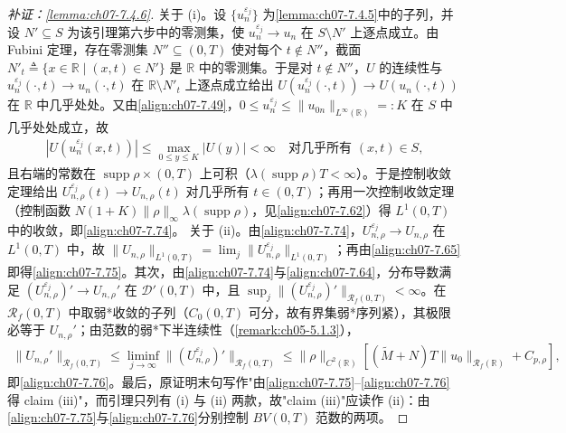 ﻿\documentclass[../../main.tex]{subfiles}%
\begin{document}
\begin{proof}[补证：\cref{lemma:ch07-7.4.6}]
关于 (i)。设 $\{u_n^{\varepsilon_j}\}$ 为\cref{lemma:ch07-7.4.5}中的子列，并设 $N'\subseteq S$ 为该引理第六步中的零测集，使 $u_n^{\varepsilon_j}\to u_n$ 在 $S\setminus N'$ 上逐点成立。由 Fubini 定理，存在零测集 $N''\subseteq(0,T)$ 使对每个 $t\notin N''$，截面 $N'_t\triangleq\{x\in\mathbb{R}\mid(x,t)\in N'\}$ 是 $\mathbb{R}$ 中的零测集。于是对 $t\notin N''$，$U$ 的连续性与 $u_n^{\varepsilon_j}(\cdot,t)\to u_n(\cdot,t)$ 在 $\mathbb{R}\setminus N'_t$ 上逐点成立给出 $U(u_n^{\varepsilon_j}(\cdot,t))\to U(u_n(\cdot,t))$ 在 $\mathbb{R}$ 中几乎处处。又由\eqref{align:ch07-7.49}，$0\leqslant u_n^{\varepsilon_j}\leqslant\|u_{0n}\|_{L^\infty(\mathbb{R})}=:K$ 在 $S$ 中几乎处处成立，故
\begin{align*}
|U(u_n^{\varepsilon_j}(x,t))|\leqslant\max_{0\leqslant y\leqslant K}|U(y)|<\infty\quad\text{对几乎所有 }(x,t)\in S,
\end{align*}
且右端的常数在 $\operatorname{supp}\rho\times(0,T)$ 上可积（$\lambda(\operatorname{supp}\rho)T<\infty$）。于是控制收敛定理给出 $U_{n,\rho}^{\varepsilon_j}(t)\to U_{n,\rho}(t)$ 对几乎所有 $t\in(0,T)$；再用一次控制收敛定理（控制函数 $N(1+K)\|\rho\|_\infty\lambda(\operatorname{supp}\rho)$，见\eqref{align:ch07-7.62}）得 $L^1(0,T)$ 中的收敛，即\eqref{align:ch07-7.74}。
关于 (ii)。由\eqref{align:ch07-7.74}，$U_{n,\rho}^{\varepsilon_j}\to U_{n,\rho}$ 在 $L^1(0,T)$ 中，故 $\|U_{n,\rho}\|_{L^1(0,T)}=\lim_j\|U_{n,\rho}^{\varepsilon_j}\|_{L^1(0,T)}$；再由\eqref{align:ch07-7.65}即得\eqref{align:ch07-7.75}。其次，由\eqref{align:ch07-7.74}与\eqref{align:ch07-7.64}，分布导数满足 $(U_{n,\rho}^{\varepsilon_j})'\to U_{n,\rho}'$ 在 $\mathscr{D}'(0,T)$ 中，且 $\sup_j\|(U_{n,\rho}^{\varepsilon_j})'\|_{\mathscr{R}_f(0,T)}<\infty$。在 $\mathscr{R}_f(0,T)$ 中取弱*收敛的子列（$C_0(0,T)$ 可分，故有界集弱*序列紧），其极限必等于 $U_{n,\rho}'$；由范数的弱*下半连续性（\cref{remark:ch05-5.1.3}），
\begin{align*}
\|U_{n,\rho}'\|_{\mathscr{R}_f(0,T)}\leqslant\liminf_{j\to\infty}\|(U_{n,\rho}^{\varepsilon_j})'\|_{\mathscr{R}_f(0,T)}
\leqslant\|\rho\|_{C^2(\mathbb{R})}[(\widetilde M+N)T\|u_0\|_{\mathscr{R}_f(\mathbb{R})}+C_{p,\rho}],
\end{align*}
即\eqref{align:ch07-7.76}。最后，原证明末句写作"由\eqref{align:ch07-7.75}--\eqref{align:ch07-7.76} 得 claim (iii)"，而引理只列有 (i) 与 (ii) 两款，故"claim (iii)"应读作 (ii)：由\eqref{align:ch07-7.75}与\eqref{align:ch07-7.76}分别控制 $BV(0,T)$ 范数的两项。
\end{proof}
\end{document}
